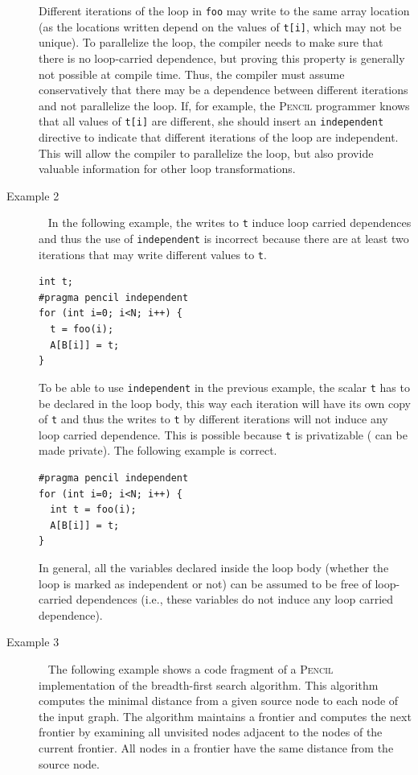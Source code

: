 \documentclass{carp}
\newcommand\pencil{\textsc{Pencil}\xspace}
\begin{document}
\begin{description}
  Different iterations of the loop in \lstinline!foo! may write to the
  same array location (as the locations written depend on the values of
  \lstinline!t[i]!, which may not be unique).
  To parallelize the loop, the compiler
  needs to make sure that there is no loop-carried dependence, but
  proving this property is generally not possible at compile time.  Thus, the
  compiler must assume conservatively that there may be a dependence
  between different iterations and not parallelize the loop.
  If, for example, the \pencil programmer knows that all values of
  \lstinline!t[i]! are different, she
  should insert an \lstinline!independent! directive to indicate that different
  iterations of the loop are independent. This will allow the compiler to
  parallelize the loop, but also provide valuable
  information for other loop transformations.

\item [Example 2]~
  In the following example, the writes to \lstinline!t! induce loop carried
  dependences and thus the use of \lstinline!independent! is incorrect because
  there are at least two iterations that may write different values to
  \lstinline!t!.

  \begin{lstlisting}[language=pencil]
int t;
#pragma pencil independent
for (int i=0; i<N; i++) {
  t = foo(i);
  A[B[i]] = t;
}
  \end{lstlisting}  
  
  To be able to use \lstinline!independent! in the previous example, the
  scalar \lstinline!t! has to be declared in the loop body, this way each
  iteration will have its own copy of \lstinline!t! and thus the writes to
  \lstinline!t! by different iterations will not induce any loop carried
  dependence.  This is possible because \lstinline!t! is privatizable (\ie
  can be made private).
  The following example is correct.

  \begin{lstlisting}[language=pencil]
#pragma pencil independent
for (int i=0; i<N; i++) {
  int t = foo(i);
  A[B[i]] = t;
}
  \end{lstlisting}
   
  In general, all the variables declared inside the loop body (whether the loop
  is marked as independent or not) can be assumed to be free of loop-carried
  dependences (i.e., these variables do not induce any loop carried dependence).

\item [Example 3]~
  The following example shows a code fragment of a \pencil
  implementation of the breadth-first search algorithm.
  This algorithm computes the minimal distance from a given source node to
  each node of the input graph.
  The algorithm maintains a frontier and computes the next frontier by examining
  all unvisited nodes adjacent to the nodes of the current frontier.
  All nodes in a frontier have the same distance from the source node.


\end{description}
\end{document}
